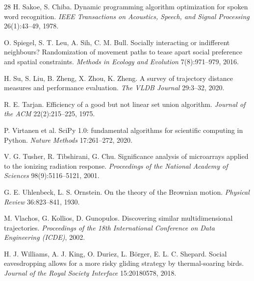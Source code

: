 \begin{thebibliography}{28}
 H. Sakoe, S. Chiba. Dynamic programming algorithm optimization for spoken word
recognition. \emph{IEEE Transactions on Acoustics, Speech, and Signal Processing} 26(1):43--49,
1978.

 O. Spiegel, S. T. Leu, A. Sih, C. M. Bull. Socially interacting or indifferent
neighbours? Randomization of movement paths to tease apart social preference and spatial
constraints. \emph{Methods in Ecology and Evolution} 7(8):971--979, 2016.

 H. Su, S. Liu, B. Zheng, X. Zhou, K. Zheng. A survey of trajectory distance
measures and performance evaluation. \emph{The VLDB Journal} 29:3--32, 2020.

 R. E. Tarjan. Efficiency of a good but not linear set union algorithm.
\emph{Journal of the ACM} 22(2):215--225, 1975.

 P. Virtanen et al. SciPy 1.0: fundamental algorithms for scientific
computing in Python. \emph{Nature Methods} 17:261--272, 2020.

 V. G. Tusher, R. Tibshirani, G. Chu. Significance analysis of microarrays applied
to the ionizing radiation response. \emph{Proceedings of the National Academy of Sciences}
98(9):5116--5121, 2001.

 G. E. Uhlenbeck, L. S. Ornstein. On the theory of the Brownian motion.
\emph{Physical Review} 36:823--841, 1930.

 M. Vlachos, G. Kollios, D. Gunopulos. Discovering similar multidimensional
trajectories. \emph{Proceedings of the 18th International Conference on Data Engineering (ICDE)},
2002.

 H. J. Williams, A. J. King, O. Duriez, L. Börger, E. L. C. Shepard. Social
eavesdropping allows for a more risky gliding strategy by thermal-soaring birds. \emph{Journal of
the Royal Society Interface} 15:20180578, 2018.

\end{thebibliography}
